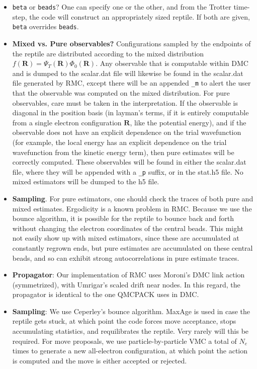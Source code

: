 \begin{itemize}
\item \texttt{beta} or \texttt{beads}?  One can specify one or the other, and from the Trotter time-step, the code will construct an appropriately sized reptile.  If both are given, \texttt{beta} overrides \texttt{beads}.  

\item \textbf{Mixed vs. Pure observables?}  Configurations sampled by the endpoints of the reptile are distributed according to the mixed distribution $f(\mathbf{R})=\Psi_T(\mathbf{R})\Phi_0(\mathbf{R})$.  Any observable that is computable within DMC and is dumped to the scalar.dat file will likewise be found in the scalar.dat file generated by RMC, except there will be an appended \texttt{\_m} to alert the user that the observable was computed on the mixed distribution.  For pure observables, care must be taken in the interpretation.  If the observable is diagonal in the position basis (in layman's terms, if it is entirely computable from a single electron configuration $\mathbf{R}$, like the potential energy), and if the observable does not have an explicit dependence on the trial wavefunction (for example, the local energy has an explicit dependence on the trial wavefunction from the kinetic energy term), then pure estimates will be correctly computed.  These observables will be found in either the scalar.dat file, where they will be appended with a \texttt{\_p} suffix, or in the stat.h5 file.  No mixed estimators will be dumped to the h5 file. 

\item \textbf{Sampling}.  For pure estimators, one should check the traces of both pure and mixed estimates.  Ergodicity is a known problem in RMC.  Because we use the bounce algorithm, it is possible for the reptile to bounce back and forth without changing the electron coordinates of the central beads.  This might not easily show up with mixed estimators, since these are accumulated at constantly regrown ends, but pure estimates are accumulated on these central beads, and so can exhibit strong autocorrelations in pure estimate traces.  

\item \textbf{Propagator}:  Our implementation of RMC uses Moroni's DMC link action (symmetrized), with Umrigar's scaled drift near nodes.  In this regard, the propagator is identical to the one QMCPACK uses in DMC.  

\item \textbf{Sampling}:  We use Ceperley's bounce algorithm.  MaxAge is used in case the reptile gets stuck, at which point the code forces move acceptance, stops accumulating statistics, and requilibrates the reptile.  Very rarely will this be required.  For move proposals, we use particle-by-particle VMC a total of $N_e$ times to generate a new all-electron configuration, at which point the action is computed and the move is either accepted or rejected.  
\end{itemize}




